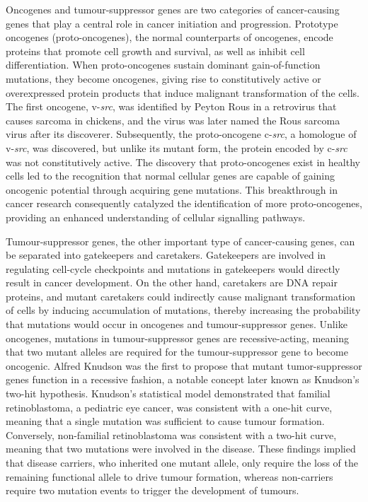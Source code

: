 Oncogenes and tumour-suppressor genes are two categories of cancer-causing genes that play a central role in cancer initiation and progression. Prototype oncogenes (proto-oncogenes), the normal counterparts of oncogenes, encode proteins that promote cell growth and survival, as well as inhibit cell differentiation. When proto-oncogenes sustain dominant gain-of-function mutations, they become oncogenes, giving rise to constitutively active or overexpressed protein products that induce malignant transformation of the cells. The first oncogene, v-\textit{src}, was identified by Peyton Rous in a retrovirus that causes sarcoma in chickens, and the virus was later named the Rous sarcoma virus after its discoverer. Subsequently, the proto-oncogene c-\textit{src}, a homologue of v-\textit{src}, was discovered, but unlike its mutant form, the protein encoded by c-\textit{src} was not constitutively active. The discovery that proto-oncogenes exist in healthy cells led to the recognition that normal cellular genes are capable of gaining oncogenic potential through acquiring gene mutations. This breakthrough in cancer research consequently catalyzed the identification of more proto-oncogenes, providing an enhanced understanding of cellular signalling pathways.

Tumour-suppressor genes, the other important type of cancer-causing genes, can be separated into gatekeepers and caretakers. Gatekeepers are involved in regulating cell-cycle checkpoints and mutations in gatekeepers would directly result in cancer development. On the other hand, caretakers are DNA repair proteins, and mutant caretakers could indirectly cause malignant transformation of cells by inducing accumulation of mutations, thereby increasing the probability that mutations would occur in oncogenes and tumour-suppressor genes. Unlike oncogenes, mutations in tumour-suppressor genes are recessive-acting, meaning that two mutant alleles are required for the tumour-suppressor gene to become oncogenic. Alfred Knudson was the first to propose that mutant tumor-suppressor genes function in a recessive fashion, a notable concept later known as Knudson's two-hit hypothesis.  Knudson's statistical model demonstrated that familial retinoblastoma, a pediatric eye cancer, was consistent with a one-hit curve, meaning that a single mutation was sufficient to cause tumour formation. Conversely, non-familial retinoblastoma was consistent with a two-hit curve, meaning that two mutations were involved in the disease. These findings implied that disease carriers, who inherited one mutant allele, only require the loss of the remaining functional allele to drive tumour formation, whereas non-carriers require two mutation events to trigger the development of tumours.

